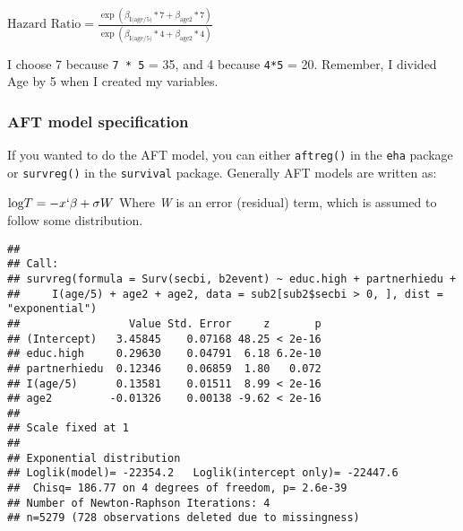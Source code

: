 \documentclass[
]{article}
\newenvironment{Shaded}{\begin{snugshade}}{\end{snugshade}}
\newcommand{\DataTypeTok}[1]{\textcolor[rgb]{0.13,0.29,0.53}{#1}}
\newcommand{\DecValTok}[1]{\textcolor[rgb]{0.00,0.00,0.81}{#1}}
\newcommand{\FloatTok}[1]{\textcolor[rgb]{0.00,0.00,0.81}{#1}}
\newcommand{\KeywordTok}[1]{\textcolor[rgb]{0.13,0.29,0.53}{\textbf{#1}}}
\newcommand{\NormalTok}[1]{#1}
\newcommand{\OperatorTok}[1]{\textcolor[rgb]{0.81,0.36,0.00}{\textbf{#1}}}
\newcommand{\StringTok}[1]{\textcolor[rgb]{0.31,0.60,0.02}{#1}}
\begin{document}
\(\text{Hazard Ratio} = \frac{\exp \left( \beta_{\text{I(age/5)}} * 7 + \beta_{\text{age2}}*7 \right )}{\exp \left( \beta_{\text{I(age/5)}} * 4 + \beta_{\text{age2}}*4 \right )}\)

I choose 7 because \texttt{7\ *\ 5} = 35, and 4 because \texttt{4*5} =
20. Remember, I divided Age by 5 when I created my variables.

\hypertarget{aft-model-specification}{%
\subsubsection{AFT model specification}\label{aft-model-specification}}

If you wanted to do the AFT model, you can either \texttt{aftreg()} in
the \texttt{eha} package or \texttt{survreg()} in the \texttt{survival}
package. Generally AFT models are written as:

\(\text{log} T = -x ` \beta + \sigma W\) Where \emph{W} is an error
(residual) term, which is assumed to follow some distribution.

\begin{Shaded}
\end{Shaded}

\begin{verbatim}
## 
## Call:
## survreg(formula = Surv(secbi, b2event) ~ educ.high + partnerhiedu + 
##     I(age/5) + age2 + age2, data = sub2[sub2$secbi > 0, ], dist = "exponential")
##                 Value Std. Error     z       p
## (Intercept)   3.45845    0.07168 48.25 < 2e-16
## educ.high     0.29630    0.04791  6.18 6.2e-10
## partnerhiedu  0.12346    0.06859  1.80   0.072
## I(age/5)      0.13581    0.01511  8.99 < 2e-16
## age2         -0.01326    0.00138 -9.62 < 2e-16
## 
## Scale fixed at 1 
## 
## Exponential distribution
## Loglik(model)= -22354.2   Loglik(intercept only)= -22447.6
##  Chisq= 186.77 on 4 degrees of freedom, p= 2.6e-39 
## Number of Newton-Raphson Iterations: 4 
## n=5279 (728 observations deleted due to missingness)
\end{verbatim}
\end{document}
